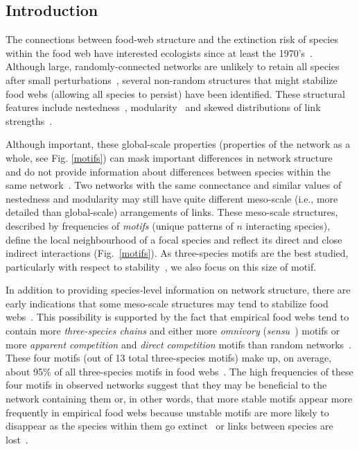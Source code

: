\documentclass[12pt]{article}
\begin{document}
\begin{spacing}{1.0}
\clearpage
    
\section*{Introduction}

	The connections between food-web structure and the extinction risk of species within the food web have interested ecologists since at least the 1970's~\citep{May1972}. Although large, randomly-connected networks are unlikely to retain all species after small perturbations~\citep{Gardner1970,May1972}, several non-random structures that might stabilize food webs (allowing all species to persist) have been identified. These structural features include nestedness~\citep{Allesina2012,Sauve2014}, modularity~\citep{Sauve2014,Thebault2010} and skewed distributions of link strengths~\citep{McCann1998,Gross2009,Rooney2012,Wootton2016}.
	
	
	Although important, these global-scale properties (properties of the network as a whole, see Fig. \ref{motifs}) can mask important differences in network structure~\citep{Simmons2019} and do not provide information about differences between species within the same network~\citep{Cirtwill2018FoodWebs}. 
	Two networks with the same connectance and similar values of nestedness and modularity may still have quite different meso-scale (i.e., more detailed than global-scale) arrangements of links. 
	These meso-scale structures, described by frequencies of \emph{motifs} (unique patterns of $n$ interacting species), define the local neighbourhood of a focal species and reflect its direct and close indirect interactions (Fig.~\ref{motifs}).
    As three-species motifs are the best studied, particularly with respect to stability~\citep{Stouffer2007,Borrelli2015,Borrelli2015a,Giling2019b}, we also focus on this size of motif.
	
	
    In addition to providing species-level information on network structure, there are early indications that some meso-scale structures may tend to stabilize food webs~\citep{Prill2005,Borrelli2015,Monteiro2016}. 
    This possibility is supported by the fact that empirical food webs tend to contain more \emph{three-species chains} and either more \emph{omnivory} (\emph{sensu}~\citealp[]{Thompson2007b}) motifs or more \emph{apparent competition} and \emph{direct competition} motifs than random networks~\citep{Stouffer2007}. 
    These four motifs (out of 13 total three-species motifs) make up, on average, about 95\% of all three-species motifs in food webs~\citep{Stouffer2010b}. 
    The high frequencies of these four motifs in observed networks suggest that they may be beneficial to the network containing them or, in other words, that more stable motifs appear more frequently in empirical food webs because unstable motifs are more likely to disappear as the species within them go extinct~\citep{Borrelli2015,Borrelli2015a} or links between species are lost~\citep{Tylianakis2010}.


\end{spacing}
\end{document}
